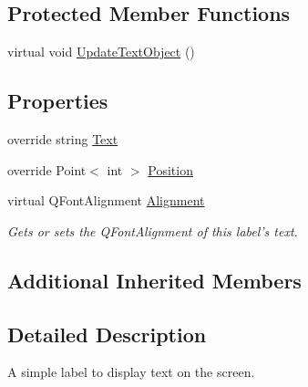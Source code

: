 \subsection*{Protected Member Functions}
\begin{DoxyCompactItemize}
\item 
virtual void \hyperlink{class_tri_devs_1_1_tri_engine2_d_1_1_u_i_1_1_label_abfc2bbb0e44e6b54b98b89e4a37653bf}{Update\-Text\-Object} ()
\end{DoxyCompactItemize}
\subsection*{Properties}
\begin{DoxyCompactItemize}
\item 
override string \hyperlink{class_tri_devs_1_1_tri_engine2_d_1_1_u_i_1_1_label_a06d91dd4e855e27c97b5b652653e4971}{Text}
\item 
override Point$<$ int $>$ \hyperlink{class_tri_devs_1_1_tri_engine2_d_1_1_u_i_1_1_label_adc1aa6af6f6ba7e66611ae9be5a1033b}{Position}
\item 
virtual Q\-Font\-Alignment \hyperlink{class_tri_devs_1_1_tri_engine2_d_1_1_u_i_1_1_label_a9070b8e7fd4e88683c44b1d3348753dc}{Alignment}
\begin{DoxyCompactList}\small\item\em Gets or sets the Q\-Font\-Alignment of this label's text. \end{DoxyCompactList}\end{DoxyCompactItemize}
\subsection*{Additional Inherited Members}


\subsection{Detailed Description}
A simple label to display text on the screen. 



